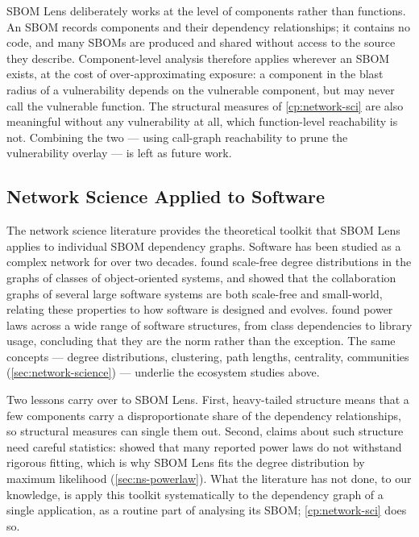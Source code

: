 SBOM Lens deliberately works at the level of components rather than functions. An SBOM records components and their dependency relationships; it contains no code, and many SBOMs are produced and shared without access to the source they describe. Component-level analysis therefore applies wherever an SBOM exists, at the cost of over-approximating exposure: a component in the blast radius of a vulnerability depends on the vulnerable component, but may never call the vulnerable function. The structural measures of \autoref{cp:network-sci} are also meaningful without any vulnerability at all, which function-level reachability is not. Combining the two --- using call-graph reachability to prune the vulnerability overlay --- is left as future work.


\subsection{Network Science Applied to Software}
\label{sec:rw-network-science}

The network science literature provides the theoretical toolkit that SBOM Lens applies to individual SBOM dependency graphs. Software has been studied as a complex network for over two decades. \citet{Valverde2002} found scale-free degree distributions in the graphs of classes of object-oriented systems, and \citet{Myers2003} showed that the collaboration graphs of several large software systems are both scale-free and small-world, relating these properties to how software is designed and evolves. \citet{Louridas2008} found power laws across a wide range of software structures, from class dependencies to library usage, concluding that they are the norm rather than the exception. The same concepts --- degree distributions, clustering, path lengths, centrality, communities (\autoref{sec:network-science}) --- underlie the ecosystem studies above.

Two lessons carry over to SBOM Lens. First, heavy-tailed structure means that a few components carry a disproportionate share of the dependency relationships, so structural measures can single them out. Second, claims about such structure need careful statistics: \citet{Clauset2009} showed that many reported power laws do not withstand rigorous fitting, which is why SBOM Lens fits the degree distribution by maximum likelihood (\autoref{sec:ns-powerlaw}). What the literature has not done, to our knowledge, is apply this toolkit systematically to the dependency graph of a single application, as a routine part of analysing its SBOM; \autoref{cp:network-sci} does so.


